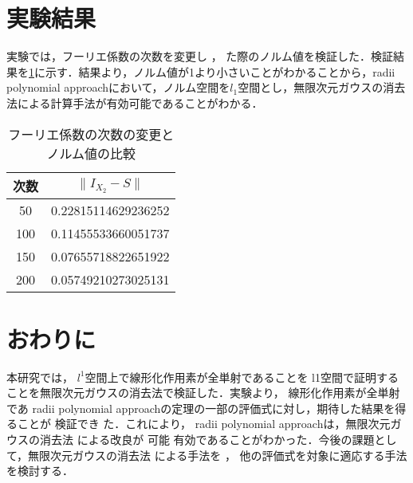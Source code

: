 \documentclass[a4paper,10pt,twocolumn]{jsarticle}
\newcommand{\rad}{radii polynomial approach}
\providecommand{\DIFaddtex}[1]{{\protect\color{blue} \sf #1}} %
\providecommand{\DIFdeltex}[1]{{\protect\color{red} \scriptsize #1}} %
\providecommand{\DIFaddbegin}{} %
\providecommand{\DIFaddend}{} %
\providecommand{\DIFdelbegin}{} %
\providecommand{\DIFdelend}{} %
\providecommand{\DIFadd}[1]{\texorpdfstring{\DIFaddtex{#1}}{#1}} %
\providecommand{\DIFdel}[1]{\texorpdfstring{\DIFdeltex{#1}}{}} %
\newcommand{\DIFscaledelfig}{0.5}
\newlength{\DIFdelgraphicswidth} %
\newlength{\DIFdelgraphicsheight} %
\newcommand{\DIFaddincludegraphics}[2][]{{\color{blue}\fbox{\DIFOincludegraphics[#1]{#2}}}} %
\newcommand{\DIFdelincludegraphics}[2][]{%
\sbox{\DIFdelgraphicsbox}{\DIFOincludegraphics[#1]{#2}}%
\settoboxwidth{\DIFdelgraphicswidth}{\DIFdelgraphicsbox} %
\settoboxtotalheight{\DIFdelgraphicsheight}{\DIFdelgraphicsbox} %
\scalebox{\DIFscaledelfig}{%
\parbox[b]{\DIFdelgraphicswidth}{\usebox{\DIFdelgraphicsbox}\\[-\baselineskip] \rule{\DIFdelgraphicswidth}{0em}}\llap{\resizebox{\DIFdelgraphicswidth}{\DIFdelgraphicsheight}{%
\setlength{\unitlength}{\DIFdelgraphicswidth}%
\begin{picture}(1,1)%
\thicklines\linethickness{2pt} %
{\color[rgb]{1,0,0}\put(0,0){\framebox(1,1){}}}%
{\color[rgb]{1,0,0}\put(0,0){\line( 1,1){1}}}%
{\color[rgb]{1,0,0}\put(0,1){\line(1,-1){1}}}%
\end{picture}%
}\hspace*{3pt}}} %
} %
\DeclareRobustCommand{\DIFaddbegin}{\DIFOaddbegin \let\includegraphics\DIFaddincludegraphics} %
\DeclareRobustCommand{\DIFaddend}{\DIFOaddend \let\includegraphics\DIFOincludegraphics} %
\DeclareRobustCommand{\DIFdelbegin}{\DIFOdelbegin \let\includegraphics\DIFdelincludegraphics} %
\DeclareRobustCommand{\DIFdelend}{\DIFOaddend \let\includegraphics\DIFOincludegraphics} %
\begin{document}
\DIFdelend %
\vspace{-1mm}
\section{実験結果}
\vspace{-1mm}

実験では，フーリエ係数の次数を変更し\DIFdelbegin \DIFdel{，}\DIFdelend \DIFaddbegin \DIFadd{た際の}\DIFaddend ノルム値を検証した．検証結果を\cref{tab:norm-num}に示す．結果より，ノルム値が1より小さいことがわかることから，\rad{}において，ノルム空間を$l_1$空間とし，無限次元ガウスの消去法による計算手法が有効可能であることがわかる．
\begin{table}[htbp]
  \centering
  \caption{フーリエ係数の次数の変更とノルム値の比較}
  \label{tab:norm-num}
  \begin{tabular}{c||c}
    次数 & $\| I_{X_2}-S \|$ \\ \hline
    50 & 0.22815114629236252 \\
    100&0.11455533660051737\\
    150&0.07655718822651922\\
    200&0.05749210273025131
\end{tabular}
\end{table}

\vspace{-1mm}
\section{おわりに}
\vspace{-1mm}
本研究では，\DIFdelbegin \DIFdel{$l^1$空間上で}\DIFdelend 線形化作用素が全単射であることを\DIFaddbegin \DIFadd{l1空間で証明することを}\DIFaddend 無限次元ガウスの消去法で検証した．実験より，\DIFdelbegin \DIFdel{線形化作用素が全単射であ}\DIFdelend \DIFaddbegin \DIFadd{\rad{}の定理の一部の評価式に対し，期待した結果を得}\DIFaddend ることが\DIFdelbegin \DIFdel{検証}\DIFdelend でき\DIFdelbegin \DIFdel{た．これにより}\DIFdelend ，\DIFdelbegin \DIFdel{\rad{}は，}\DIFdelend 無限次元ガウスの消去法\DIFdelbegin \DIFdel{による改良}\DIFdelend が\DIFdelbegin \DIFdel{可能}\DIFdelend \DIFaddbegin \DIFadd{有効}\DIFaddend であることがわかった．今後の課題として，無限次元ガウスの消去法\DIFdelbegin \DIFdel{による手法}\DIFdelend を\DIFdelbegin \DIFdel{，}\DIFdelend \DIFaddbegin \DIFadd{他の}\DIFaddend 評価式を対象に適応する手法を検討する．

\vspace{-1mm}

{\footnotesize

}
\end{document}
